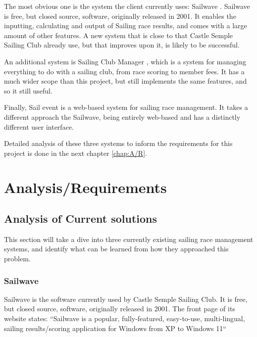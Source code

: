 \documentclass{l4proj}
\begin{document}
The most obvious one is the system the client currently uses: Sailwave \citet{sailwave}. Sailwave is free, but closed source, software, originally released in 2001. It enables the inputting, calculating and output of Sailing race results, and comes with a large amount of other features. A new system that is close to that Castle Semple Sailing Club already use, but that improves upon it, is likely to be successful. 

An additional system is Sailing Club Manager \citet{ClubManager}, which is a system for managing everything to do with a sailing club, from race scoring to member fees. It has a much wider scope than this project, but still implements the same features, and so it still useful.

Finally, Sail event \citet{SailEvent} is a web-based system for sailing race management. It takes a different approach the Sailwave, being entirely web-based and has a distinctly different user interface.

Detailed analysis of these three systems to inform the requirements for this project is done in the next chapter \autoref{chap:A/R}.




\chapter{Analysis/Requirements}\label{chap:A/R}
\section{Analysis of Current solutions}
This section will take a dive into three currently existing sailing race management systems, and identify what can be learned from how they approached this problem.
\subsection{Sailwave}
Sailwave \citet{sailwave} is the software currently used by Castle Semple Sailing Club. It is free, but closed source, software, originally released in 2001.
The front page of its website \citep{sailwave} states: “Sailwave is a popular, fully-featured, easy-to-use, multi-lingual, sailing results/scoring application for Windows from XP to Windows 11“
\end{document}
